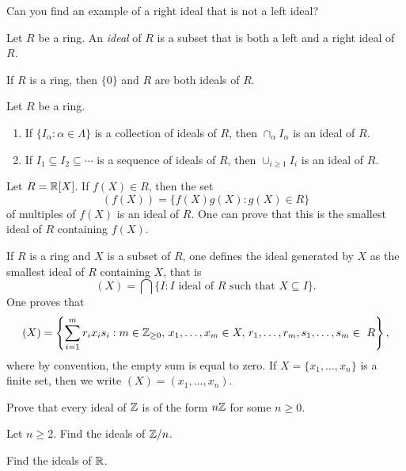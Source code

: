 Can you find an 
example of a right ideal that is not a left ideal?

\begin{definition}
Let $R$ be a ring. An \emph{ideal} of $R$ 
is a subset that is both a left and a right ideal of $R$. 
\end{definition}
 
If $R$ is a ring, then $\{0\}$ and $R$ are both ideals of $R$. 

\begin{exercise}
\label{xca:ideals}
Let $R$ be a ring. 
\begin{enumerate}
\item If $\{I_\alpha:\alpha\in\Lambda\}$ is a collection of ideals of $R$, then $\cap_{\alpha}I_\alpha$ is an ideal of $R$.  	
\item If $I_1\subseteq I_2\subseteq\cdots$ is a sequence of ideals of $R$, then $\cup_{i\geq1}I_i$ is an ideal of $R$. 
\end{enumerate}
\end{exercise}


\begin{example}
Let $R=\mathbb{R}[X]$. If $f(X)\in R$, then the set 
\[
(f(X))=\{f(X)g(X):g(X)\in R\}
\]
of multiples of $f(X)$ is an ideal of $R$. One can prove that this is the smallest 
ideal of $R$ containing $f(X)$.  	
\end{example}

If $R$ is a ring and $X$ is a subset of $R$, one defines
the ideal generated by $X$ as the smallest ideal of $R$ containing $X$, that is 
\[
(X)=\bigcap\{I:\text{$I$ ideal of $R$ such that $X\subseteq I$}\}.
\]
One proves that 
\[
(X)=\left\{\sum_{i=1}^mr_ix_is_i:m\in\Z_{\geq0},\,x_1,\dots,x_m\in X,\,r_1,\dots,r_m,s_1,\dots,s_m\in R\right\}, 
\]
where by convention, the empty sum is equal to zero. If $X=\{x_1,\dots,x_n\}$ is a finite
set, then we write $(X)=(x_1,\dots,x_n)$. 

\begin{exercise}
\label{xca:ideals_Z}
Prove that every ideal of $\mathbb{Z}$ is of the form $n\mathbb{Z}$ for some $n\geq0$. 	
\end{exercise}

\begin{exercise}
\label{xca:ideals_Zn}
Let $n\geq2$. Find the ideals of $\mathbb{Z}/n$. 	
\end{exercise}

\begin{exercise}
\label{xca:ideals_R}
Find the ideals of $\mathbb{R}$.	
\end{exercise}

